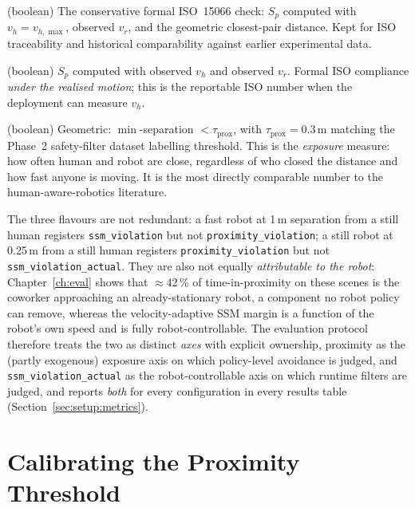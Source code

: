 \documentclass[11pt,a4paper]{report}
\newcommand{\ssm}{SSM}
\newcommand{\iso}{ISO~15066}
\begin{document}
\begin{description}[leftmargin=2em]
\item[\texttt{ssm\_violation}] (boolean) The conservative formal
  \iso{} check: $S_p$ computed with $v_h = v_{h,\max}$, observed
  $v_r$, and the geometric closest-pair distance. Kept for ISO
  traceability and historical comparability against earlier
  experimental data.
\item[\texttt{ssm\_violation\_actual}] (boolean) $S_p$ computed
  with observed $v_h$ and observed $v_r$. Formal ISO compliance
  \emph{under the realised motion}; this is the reportable ISO
  number when the deployment can measure $v_h$.
\item[\texttt{proximity\_violation}] (boolean) Geometric: $\min$-separation
  $< \tau_{\mathrm{prox}}$, with $\tau_{\mathrm{prox}} = 0.3$\,m
  matching the Phase~2 safety-filter dataset labelling threshold.
  This is the \emph{exposure} measure: how often human and robot are
  close, regardless of who closed the distance and how fast anyone
  is moving. It is the most directly comparable number to the
  human-aware-robotics literature.
\end{description}

The three flavours are not redundant: a fast robot at 1\,m
separation from a still human registers \texttt{ssm\_violation} but
not \texttt{proximity\_violation}; a still robot at 0.25\,m from a
still human registers \texttt{proximity\_violation} but not
\texttt{ssm\_violation\_actual}. They are also not equally
\emph{attributable to the robot}: Chapter~\ref{ch:eval} shows that
$\approx$42\,\% of time-in-proximity on these scenes is the coworker
approaching an already-stationary robot, a component no robot policy
can remove, whereas the velocity-adaptive \ssm{} margin is a function
of the robot's own speed and is fully robot-controllable. The
evaluation protocol therefore treats the two as distinct \emph{axes}
with explicit ownership, proximity as the (partly exogenous)
exposure axis on which policy-level avoidance is judged, and
\texttt{ssm\_violation\_actual} as the robot-controllable axis on
which runtime filters are judged, and reports \emph{both} for every
configuration in every results table
(Section~\ref{sec:setup:metrics}).

\section{Calibrating the Proximity Threshold}
\label{sec:bench:proximity-threshold}
\end{document}
